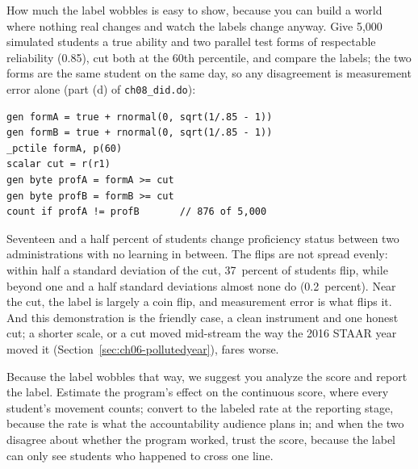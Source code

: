 \documentclass[
    a4paper,
    fontsize=10pt,
    twoside=true,
    numbers=noenddot,
]{kaobook}
\begin{document}
How much the label wobbles is easy to show, because you can build a world where nothing real changes and watch the labels change anyway. Give 5{,}000 simulated students a true ability and two parallel test forms of respectable reliability (0.85), cut both at the 60th percentile, and compare the labels; the two forms are the same student on the same day, so any disagreement is measurement error alone (part (d) of \texttt{ch08\_did.do}):
\par
{\footnotesize
\begin{verbatim}
gen formA = true + rnormal(0, sqrt(1/.85 - 1))
gen formB = true + rnormal(0, sqrt(1/.85 - 1))
_pctile formA, p(60)
scalar cut = r(r1)
gen byte profA = formA >= cut
gen byte profB = formB >= cut
count if profA != profB       // 876 of 5,000
\end{verbatim}
}
Seventeen and a half percent of students change proficiency status between two administrations with no learning in between. The flips are not spread evenly: within half a standard deviation of the cut, 37~percent of students flip, while beyond one and a half standard deviations almost none do (0.2~percent). Near the cut, the label is largely a coin flip, and measurement error is what flips it. And this demonstration is the friendly case, a clean instrument and one honest cut; a shorter scale, or a cut moved mid-stream the way the 2016 STAAR year moved it (Section~\ref{sec:ch06-pollutedyear}), fares worse.

Because the label wobbles that way, we suggest you analyze the score and report the label. Estimate the program's effect on the continuous score, where every student's movement counts; convert to the labeled rate at the reporting stage, because the rate is what the accountability audience plans in; and when the two disagree about whether the program worked, trust the score, because the label can only see students who happened to cross one line.
\end{document}
